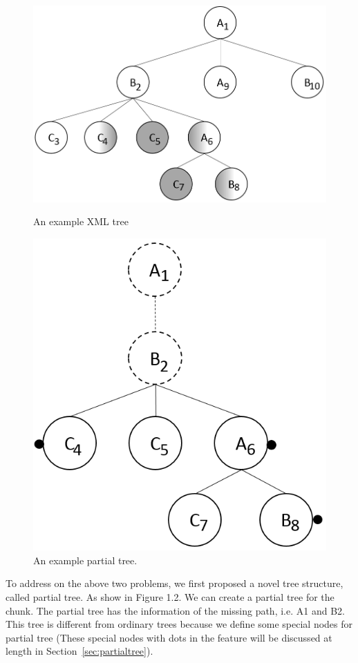 \begin{figure}[t]
	\centering\includegraphics[scale=0.3]{figures/exampletree.png}
	\caption{An example XML tree} \label{fig:exampletree}
	\centering\includegraphics[scale=0.3]{figures/examplepartialtree.png}
	\caption{An example partial tree.} \label{fig:examplepartialtree}
\end{figure}

To address on the above two problems, we first proposed a novel tree structure,
called partial tree. As show in Figure 1.2.  We can create a partial tree for
the chunk. The partial tree has the information  of the missing path, i.e. A1
and B2. This tree is different from ordinary trees  because we define some
special nodes for partial tree (These special nodes with  dots in the feature
will be discussed at length in Section~\ref{sec:partialtree}).

